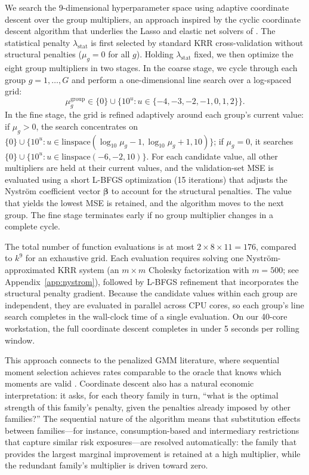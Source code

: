 We search the 9-dimensional hyperparameter space using adaptive coordinate descent over the group multipliers, an approach inspired by the cyclic coordinate descent algorithm that underlies the Lasso and elastic net solvers of \citet{friedman2010regularization}.
The statistical penalty $\lambda_{\mathrm{stat}}$ is first selected by standard KRR cross-validation without structural penalties ($\mu_g = 0$ for all $g$).
Holding $\lambda_{\mathrm{stat}}$ fixed, we then optimize the eight group multipliers in two stages.
In the coarse stage, we cycle through each group $g = 1, \ldots, G$ and perform a one-dimensional line search over a log-spaced grid:
\begin{equation}\label{eq:cd_grid}
\mu_g^{\mathrm{group}} \in \{0\} \cup \{10^{u} : u \in \{-4, -3, -2, -1, 0, 1, 2\}\}.
\end{equation}
In the fine stage, the grid is refined adaptively around each group's current value: if $\mu_g > 0$, the search concentrates on $\{0\} \cup \{10^u : u \in \mathrm{linspace}(\log_{10}\mu_g - 1, \log_{10}\mu_g + 1, 10)\}$; if $\mu_g = 0$, it searches $\{0\} \cup \{10^u : u \in \mathrm{linspace}(-6, -2, 10)\}$.
For each candidate value, all other multipliers are held at their current values, and the validation-set MSE is evaluated using a short L-BFGS optimization (15 iterations) that adjusts the Nystr\"{o}m coefficient vector $\boldsymbol{\beta}$ to account for the structural penalties.
The value that yields the lowest MSE is retained, and the algorithm moves to the next group.
The fine stage terminates early if no group multiplier changes in a complete cycle.

The total number of function evaluations is at most $2 \times 8 \times 11 = 176$, compared to $k^9$ for an exhaustive grid.
Each evaluation requires solving one Nystr\"{o}m-approximated KRR system (an $m \times m$ Cholesky factorization with $m = 500$; see Appendix~\ref{app:nystrom}), followed by L-BFGS refinement that incorporates the structural penalty gradient.
Because the candidate values within each group are independent, they are evaluated in parallel across CPU cores, so each group's line search completes in the wall-clock time of a single evaluation.
On our 40-core workstation, the full coordinate descent completes in under 5 seconds per rolling window.

This approach connects to the penalized GMM literature, where sequential moment selection achieves rates comparable to the oracle that knows which moments are valid \citep{Caner2009lasso,Cheng2015select}.
Coordinate descent also has a natural economic interpretation: it asks, for each theory family in turn, ``what is the optimal strength of this family's penalty, given the penalties already imposed by other families?''
The sequential nature of the algorithm means that substitution effects between families---for instance, consumption-based and intermediary restrictions that capture similar risk exposures---are resolved automatically: the family that provides the largest marginal improvement is retained at a high multiplier, while the redundant family's multiplier is driven toward zero.


